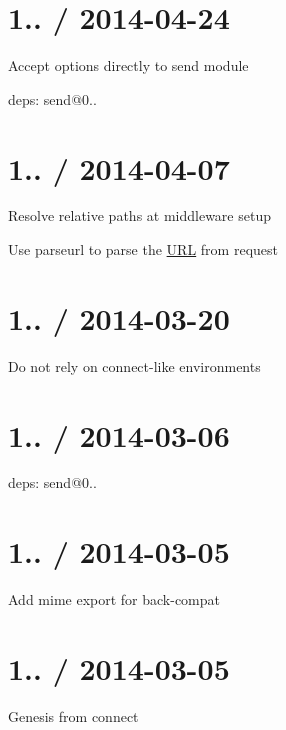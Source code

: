 \section*{1.. / 2014-\/04-\/24 }


\begin{DoxyItemize}
\item Accept options directly to {\ttfamily send} module
\item deps\+: send@0..
\end{DoxyItemize}

\section*{1.. / 2014-\/04-\/07 }


\begin{DoxyItemize}
\item Resolve relative paths at middleware setup
\item Use parseurl to parse the \hyperlink{struct_u_r_l}{U\+R\+L} from request
\end{DoxyItemize}

\section*{1.. / 2014-\/03-\/20 }


\begin{DoxyItemize}
\item Do not rely on connect-\/like environments
\end{DoxyItemize}

\section*{1.. / 2014-\/03-\/06 }


\begin{DoxyItemize}
\item deps\+: send@0..
\end{DoxyItemize}

\section*{1.. / 2014-\/03-\/05 }


\begin{DoxyItemize}
\item Add mime export for back-\/compat
\end{DoxyItemize}

\section*{1.. / 2014-\/03-\/05 }


\begin{DoxyItemize}
\item Genesis from {\ttfamily connect} 
\end{DoxyItemize}